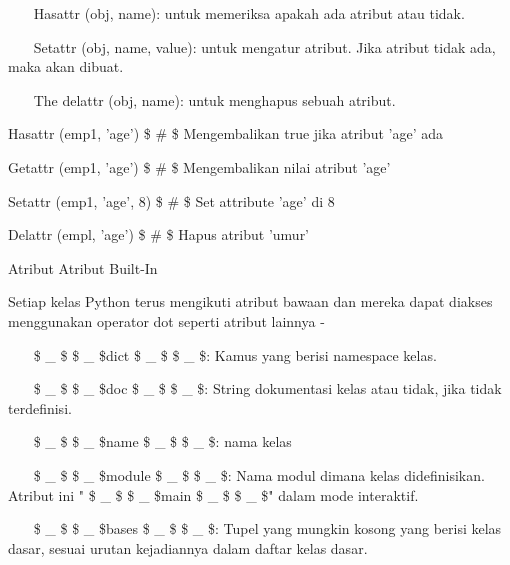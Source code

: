 \noindent 
~~~ Hasattr (obj, name): untuk memeriksa apakah ada atribut atau tidak. \par
\vspace{12pt}
\noindent 
~~~ Setattr (obj, name, value): untuk mengatur atribut. Jika atribut tidak ada, maka akan dibuat. \par
\vspace{12pt}
\noindent 
~~~ The delattr (obj, name): untuk menghapus sebuah atribut. \par
\vspace{12pt}
\noindent 
Hasattr (emp1, 'age')  \$  \#  \$ Mengembalikan true jika atribut 'age' ada \par
\noindent 
Getattr (emp1, 'age')  \$  \#  \$ Mengembalikan nilai atribut 'age' \par
\noindent 
Setattr (emp1, 'age', 8)  \$  \#  \$ Set attribute 'age' di 8 \par
\noindent 
Delattr (empl, 'age')  \$  \#  \$ Hapus atribut 'umur' \par
\vspace{12pt}
\noindent 
Atribut Atribut Built-In \par
\vspace{12pt}
\noindent 
Setiap kelas Python terus mengikuti atribut bawaan dan mereka dapat diakses menggunakan operator dot seperti atribut lainnya - \par
\vspace{12pt}
\noindent 
~~~  \$  \_  \$ \$  \_  \$dict \$  \_  \$ \$  \_  \$: Kamus yang berisi namespace kelas. \par
\vspace{12pt}
\noindent 
~~~  \$  \_  \$ \$  \_  \$doc \$  \_  \$ \$  \_  \$: String dokumentasi kelas atau tidak, jika tidak terdefinisi. \par
\vspace{12pt}
\noindent 
~~~  \$  \_  \$ \$  \_  \$name \$  \_  \$ \$  \_  \$: nama kelas \par
\vspace{12pt}
\noindent 
~~~  \$  \_  \$ \$  \_  \$module \$  \_  \$ \$  \_  \$: Nama modul dimana kelas didefinisikan. Atribut ini " \$  \_  \$ \$  \_  \$main \$  \_  \$ \$  \_  \$" dalam mode interaktif. \par
\vspace{12pt}
\noindent 
~~~  \$  \_  \$ \$  \_  \$bases \$  \_  \$ \$  \_  \$: Tupel yang mungkin kosong yang berisi kelas dasar, sesuai urutan kejadiannya dalam daftar kelas dasar. \par
\vspace{12pt}
